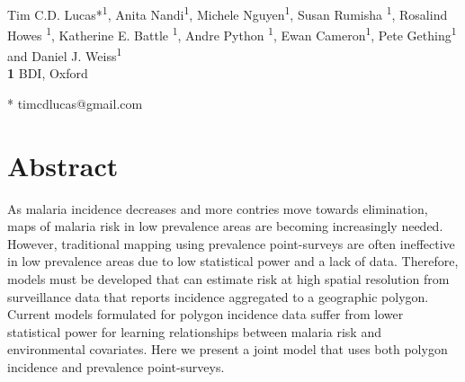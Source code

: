 \documentclass[10pt,letterpaper]{article}
\begin{document}
\vspace*{0.2in}

\begin{flushleft}
{\Large
\textbf{} %
}
\newline
\\
Tim C.D. Lucas*\textsuperscript{1}, Anita Nandi\textsuperscript{1}, Michele Nguyen\textsuperscript{1}, Susan Rumisha \textsuperscript{1}, Rosalind Howes \textsuperscript{1}, Katherine E. Battle \textsuperscript{1}, Andre Python \textsuperscript{1}, Ewan Cameron\textsuperscript{1}, Pete Gething\textsuperscript{1} and Daniel J. Weiss\textsuperscript{1}
\\
\bigskip
\textbf{1} BDI, Oxford
\\
\bigskip

% 
%




* timcdlucas@gmail.com

\end{flushleft}
\section*{Abstract}
As malaria incidence decreases and more contries move towards elimination, maps of malaria risk in low prevalence areas are becoming increasingly needed.
However, traditional mapping using prevalence point-surveys are often ineffective in low prevalence areas due to low statistical power and a lack of data.
Therefore, models must be developed that can estimate risk at high spatial resolution from surveillance data that reports incidence aggregated to a geographic polygon.
Current models formulated for polygon incidence data suffer from lower statistical power for learning relationships between malaria risk and environmental covariates.
Here we present a joint model that uses both polygon incidence and prevalence point-surveys.
\end{document}
